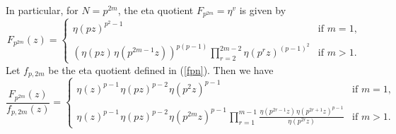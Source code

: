 \documentclass[a4paper,11pt]{amsart}
\begin{document}
In particular, for $N=p^{2m}$, the eta quotient $F_{p^{2m}}=\eta^v$ is given by 
\begin{equation}F_{p^{2m}}(z)=\left\{\begin{array}{ll}
      \eta(pz)^{p^2-1}&\text{if $m=1$,}\\
\\
(\eta(pz)\hspace{1pt}\eta(p^{2m-1}z))^{p(p-1)}\hspace{1pt}\prod_{r=2}^{2m-2}\eta(p^{r}z)^{(p-1)^2}
                      &\text{if $m>1$.}\end{array}\right.\end{equation}
Let $f_{p,2m}$ be the eta quotient defined in (\ref{fpn}). %
Then we have
\begin{equation}\frac{F_{p^{2m}}(z)}{f_{p,2m}(z)}=\left\{\begin{array}{ll}
    \eta(z)^{p-1}\hspace{1pt}\eta(pz)^{p-2}\hspace{1pt}\eta(p^2z)^{p-1}&\text{if $m=1$,}\\
\\
\eta(z)^{p-1}\hspace{1pt}\eta(pz)^{p-2}\hspace{1pt}\eta(p^{2m}z)^{p-1}\hspace{1pt}\prod_{r=1}^{m-1}\frac{\eta(p^{2r-1}z)\hspace{1pt}\eta(p^{2r+1}z)^{p-1}}{\eta(p^{2r}z)}
                      &\text{if $m>1$.}\end{array}\right.\label{k3}\end{equation}
\end{document}
